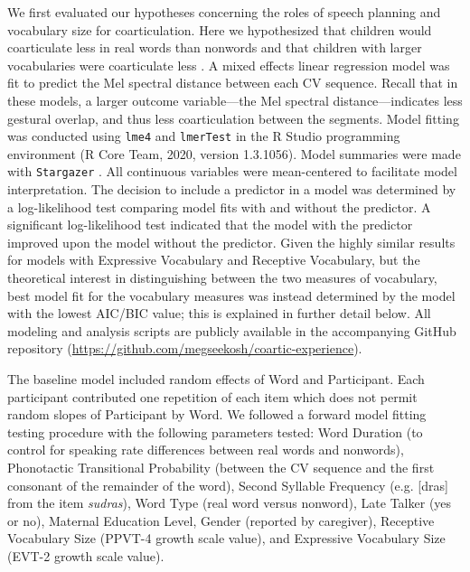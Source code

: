 \documentclass[a4paper,man,natbib,donotrepeattitle, apacite]{apa6}
\begin{document}
We first evaluated our hypotheses concerning the roles of speech planning and vocabulary size for coarticulation. Here we hypothesized that children would coarticulate less in  real words than nonwords and that children with larger vocabularies were coarticulate less \cite{noiraySpokenLanguageDevelopment2019}. A mixed effects linear regression model was fit to predict the Mel spectral distance between each CV sequence. Recall that in these models, a larger outcome variable---the Mel spectral distance---indicates less gestural overlap, and thus less coarticulation between the segments. Model fitting was conducted using \texttt{lme4} \cite{batesFittingLinearMixedeffects2015} and \texttt{lmerTest} \cite{kuznetsovaLmerTestPackageTests2017} in the R Studio programming environment (R Core Team, 2020, version 1.3.1056). Model summaries were made with \texttt{Stargazer} \cite{hlavacStargazerWellFormattedRegression2018}. All continuous variables were mean-centered to facilitate model interpretation. The decision to include a predictor in a model was determined by a log-likelihood test comparing model fits with and without the predictor. A significant log-likelihood test indicated that the model with the predictor improved upon the model without the predictor. Given the highly similar results for models with Expressive Vocabulary and Receptive Vocabulary, but the theoretical interest in distinguishing between the two measures of vocabulary, best model fit for the vocabulary measures was instead determined by the model with the lowest AIC/BIC value; this is explained in further detail below. All modeling and analysis scripts are publicly available in the accompanying GitHub repository (\url{https://github.com/megseekosh/coartic-experience}). 

The baseline model included random effects of Word and Participant. Each participant contributed one repetition of each item which does not permit random slopes of Participant by Word. We followed a forward model fitting testing procedure with the following parameters tested: Word Duration (to control for speaking rate differences between real words and nonwords), Phonotactic Transitional Probability (between the CV sequence and the first consonant of the remainder of the word), Second Syllable Frequency (e.g. [dras] from the item \textit{sudras}), Word Type (real word versus nonword), Late Talker (yes or no), Maternal Education Level, Gender (reported by caregiver), Receptive Vocabulary Size (PPVT-4 growth scale value), and Expressive Vocabulary Size (EVT-2 growth scale value). 
\end{document}
